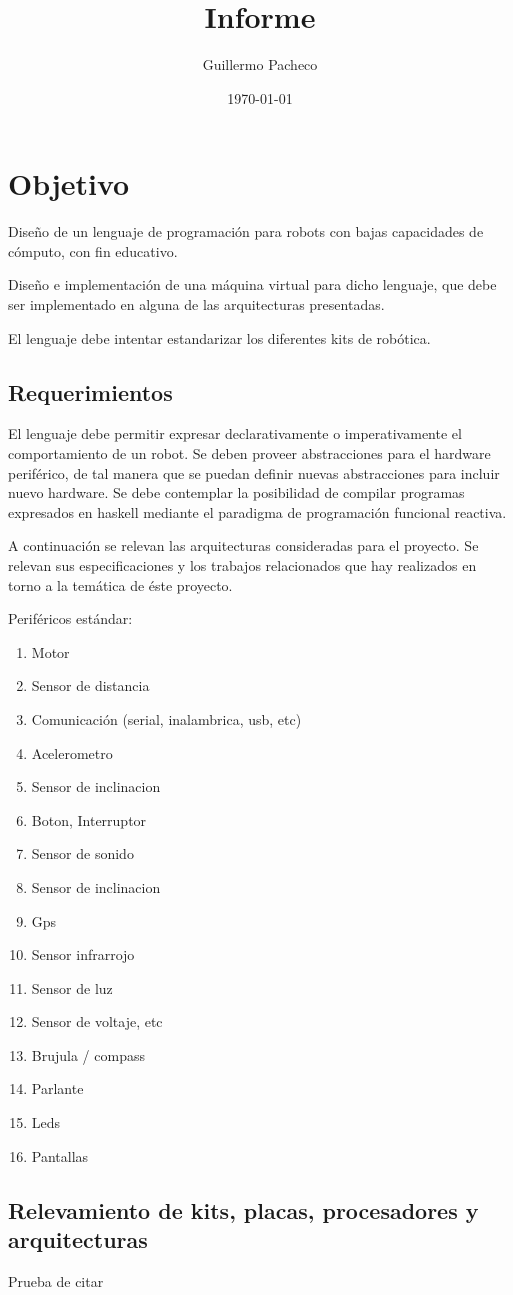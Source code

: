 \documentclass[a4paper, 11pt, oneside]{report}
\title{Informe}
\author{Guillermo Pacheco}
\date{\today}
\begin{document}
\maketitle

\chapter{Objetivo}

Diseño de un lenguaje de programación para robots con bajas capacidades de cómputo, con fin educativo.

Diseño e implementación de una máquina virtual para dicho lenguaje, que debe ser implementado en alguna de las
arquitecturas presentadas.

El lenguaje debe intentar estandarizar los diferentes kits de robótica.

\section{Requerimientos}

El lenguaje debe permitir expresar declarativamente o imperativamente el 
comportamiento de un robot.
Se deben proveer abstracciones para el hardware periférico, de tal manera que 
se puedan definir nuevas abstracciones para incluir nuevo hardware.
Se debe contemplar la posibilidad de compilar programas expresados en haskell 
mediante el paradigma de programación funcional reactiva.

A continuación se relevan las arquitecturas consideradas para el proyecto.
Se relevan sus especificaciones y los trabajos relacionados que hay realizados
 en torno a la temática de éste proyecto.

Periféricos estándar:

\begin {enumerate}
  \item Motor
  \item Sensor de distancia
  \item Comunicación (serial, inalambrica, usb, etc)
  \item Acelerometro
  \item Sensor de inclinacion
  \item Boton, Interruptor
  \item Sensor de sonido
  \item Sensor de inclinacion
  \item Gps
  \item Sensor infrarrojo
  \item Sensor de luz
  \item Sensor de voltaje, etc
  \item Brujula / compass
  \item Parlante
  \item Leds
  \item Pantallas
\end {enumerate}


\section{Relevamiento de kits, placas, procesadores y arquitecturas}

Prueba de citar \cite{Guillermo2014}





\end{document}
